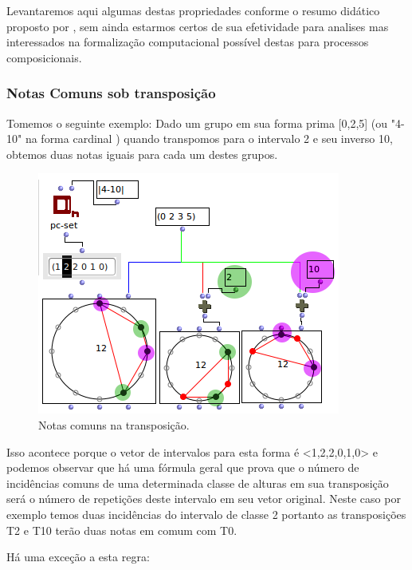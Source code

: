 \documentclass[
	12pt,				%
	openright,			%
	twoside,			%
	a4paper,			%
	english,			%
	french,				%
	spanish,			%
	brazil				%
	]{abntex2}
\begin{document}
Levantaremos aqui algumas destas propriedades conforme o resumo didático proposto por \cite{straus2004}, sem ainda estarmos certos de sua efetividade para analises mas interessados na formalização computacional possível destas para processos composicionais.

\pagebreak
\subsubsection{Notas Comuns sob transposição}

Tomemos o seguinte exemplo: Dado um grupo em sua forma prima [0,2,5] (ou "4-10" na forma cardinal ) quando transpomos para o intervalo 2 e seu inverso 10, obtemos duas notas iguais para cada um destes grupos.

\begin{figure}[!h]
	\caption{\label{fig_grafico}Notas comuns na transposição. }
	\begin{center}
	    \includegraphics[scale=0.7]{OM_settheory/notas_comuns_2e10.png}
	\end{center}
\end{figure}



Isso acontece porque o vetor de intervalos para esta forma é <1,2,2,0,1,0> e podemos observar que há uma fórmula geral que prova que o número de incidências comuns de uma determinada classe de alturas em sua transposição será o número de repetições deste intervalo em seu vetor original. Neste caso por exemplo temos duas incidências do intervalo de classe 2 portanto as transposições T2 e T10 terão duas notas em comum com T0.

Há uma exceção a esta regra:
 
\end{document}
